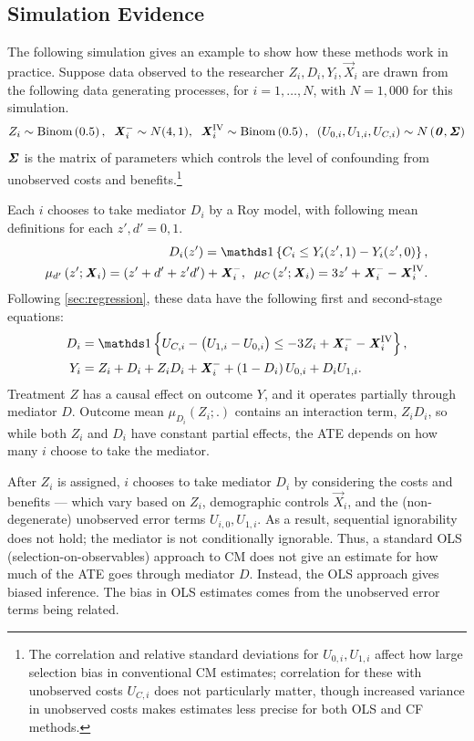 \subsection{Simulation Evidence}
\label{sec:simulations}
The following simulation gives an example to show how these methods work in practice.
Suppose data observed to the researcher $Z_i, D_i, Y_i, \vec X_i$ are drawn from the following data generating processes, for $i = 1, \hdots, N$, with 
$N = 1,000$ for this simulation.
\[ Z_i \sim \text{Binom}\left(0.5 \right),
    \;\; \boldsymbol{\mathit{X}}_i^- \sim N(4, 1),
    \;\; \boldsymbol{\mathit{X}}_i^{\text{IV}} \sim \text{Binom}\left( 0.5 \right),
    \;\; \left( U_{0,i}, U_{1,i}, U_{C,i} \right) \sim
    N\left( \boldsymbol{\mathit{0}}, \boldsymbol{\mathit{\Sigma}} \right) \]
$\boldsymbol{\mathit{\Sigma}}$ is the matrix of parameters which controls the level of confounding from unobserved costs and benefits.\footnote{
    The correlation and relative standard deviations for $U_{0,i}, U_{1,i}$ affect how large selection bias in conventional CM estimates; correlation for these with unobserved costs $U_{C,i}$ does not particularly matter, though increased variance in unobserved costs makes estimates less precise for both OLS and CF methods.
}

Each $i$ chooses to take mediator $D_i$ by a Roy model, with following mean definitions for each $z', d' = 0, 1$.
\begin{align*}
    D_i(z') = \indicator{C_i \leq Y_i(z', 1) - Y_i(z', 0)},  \\
    \mu_{d'}\left(z' ; \vec X_i \right) = \left( z' + d' + z' d' \right) + \vec X_i^-,
    \;\; \mu_{C}\left(z' ; \vec X_i \right) = 3z' + \vec X_i^- - \vec X_i^{\text{IV}}.
\end{align*}
Following \autoref{sec:regression}, these data have the following first and second-stage equations:
\begin{align*}
    D_i &= \indicator{U_{C,i} - \big( U_{1,i} - U_{0,i} \big)
    \leq -3Z_i + \vec X_i^- - \vec X_i^{\text{IV}}},  \\
    Y_i &= Z_i + D_i + Z_i D_i + \vec X_i^-
        + \left( 1 - D_i \right) U_{0,i} + D_i U_{1,i}.
\end{align*}
Treatment $Z$ has a causal effect on outcome $Y$, and it operates partially through mediator $D$.
Outcome mean $\mu_{D_i}(Z_i;.)$ contains an interaction term, $Z_i D_i$, so while both $Z_i$ and $D_i$ have constant partial effects, the ATE depends on how many $i$ choose to take the mediator.

After $Z_i$ is assigned, $i$ chooses to take mediator $D_i$ by considering the costs and benefits --- which vary based on $Z_i$, demographic controls $\vec X_i$, and the (non-degenerate) unobserved error terms $U_{i,0}, U_{1,i}$.
As a result, sequential ignorability does not hold; the mediator is not conditionally ignorable.
Thus, a standard OLS (selection-on-observables) approach to CM does not give an estimate for how much of the ATE goes through mediator $D$.
Instead, the OLS approach gives biased inference.
The bias in OLS estimates comes from the unobserved error terms being related.

